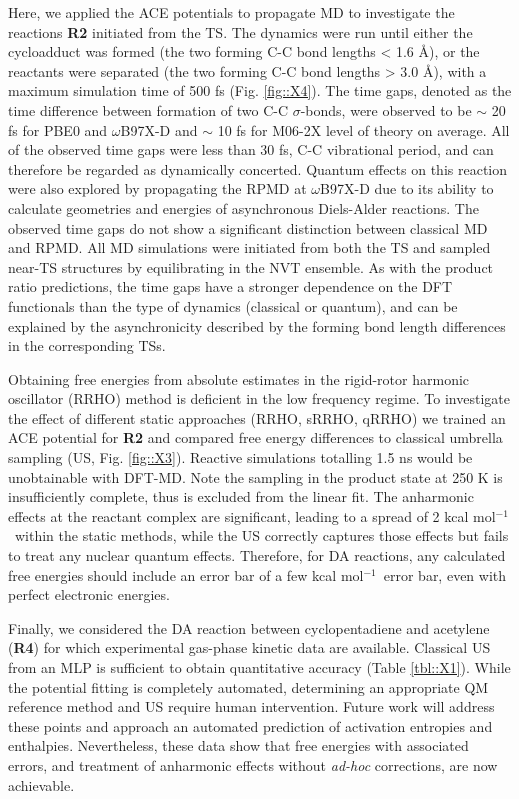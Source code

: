 \documentclass[twoside,twocolumn,9pt]{article}
\newcommand{\kcal}{kcal mol$^{-1}$}
\begin{document}
Here, we applied the ACE potentials to propagate MD to investigate the reactions {\bfseries{R2}} initiated from the TS. The dynamics were run until either the cycloadduct was formed (the two forming C-C bond lengths < 1.6 Å), or the reactants were separated (the two forming C-C bond lengths > 3.0 Å), with a maximum simulation time of 500 fs (Fig. \ref{fig::X4}). The time gaps, denoted as the time difference between formation of two C-C $\sigma$-bonds, were observed to be $\sim$ 20 fs for PBE0 and $\omega$B97X-D and $\sim$ 10 fs for M06-2X level of theory on average. All of the observed time gaps were less than 30 fs, C-C vibrational period, and can therefore be regarded as dynamically concerted. Quantum effects on this reaction were also explored by propagating the RPMD at $\omega$B97X-D due to its ability to calculate geometries and energies of asynchronous Diels-Alder reactions. The observed time gaps do not show a significant distinction between classical MD and RPMD. All MD simulations were initiated from both the TS and sampled near-TS structures by equilibrating in the NVT ensemble. As with the product ratio predictions, the time gaps have a stronger dependence on the DFT functionals than the type of dynamics (classical or quantum), and can be explained by the asynchronicity described by the forming bond length differences in the corresponding TSs.

Obtaining free energies from absolute estimates in the rigid-rotor harmonic oscillator (RRHO) method is deficient in the low frequency regime.\cite{Liu2017} To investigate the effect of different static approaches (RRHO, sRRHO,\cite{Ribeiro2011} qRRHO\cite{Grimme2012}) we trained an ACE potential for {\bfseries{R2}} and compared free energy differences to classical umbrella sampling (US, Fig. \ref{fig::X3}). Reactive simulations totalling 1.5 ns would be unobtainable with DFT-MD. Note the sampling in the product state at 250 K is insufficiently complete, thus is excluded from the linear fit. The anharmonic effects at the reactant complex are significant, leading to a spread of 2 \kcal~within the static methods, while the US correctly captures those effects but fails to treat any nuclear quantum effects. Therefore, for DA reactions, any calculated free energies should include an error bar of a few \kcal~error bar, even with perfect electronic energies.

Finally, we considered the DA reaction between cyclopentadiene and acetylene ({\bfseries{R4}}) for which experimental gas-phase kinetic data are available.\cite{Walsh1975} Classical US from an MLP is sufficient to obtain quantitative accuracy (Table \ref{tbl::X1}). While the potential fitting is completely automated, determining an appropriate QM reference method and US require human intervention. Future work will address these points and approach an automated prediction of activation entropies and enthalpies. Nevertheless, these data show that free energies with associated errors, and treatment of anharmonic effects without \emph{ad-hoc} corrections, are now achievable.
\end{document}
